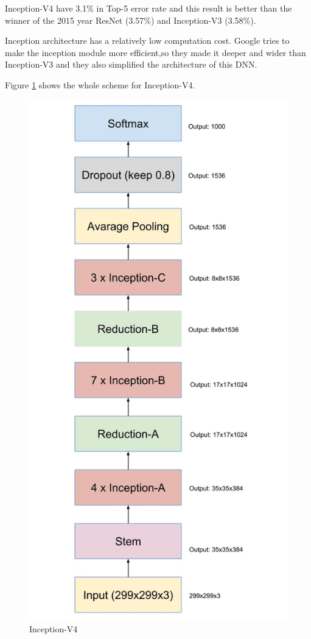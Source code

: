 \documentclass[titlepage]{report}
\begin{document}
Inception-V4 have 3.1\% in Top-5 error rate and this result is better than the winner of the 2015 year ResNet (3.57\%) and  Inception-V3 (3.58\%). 

Inception architecture has a relatively low computation cost. Google tries to make the inception module more efficient,so they made it deeper and wider than Inception-V3 and they also simplified the architecture of this DNN.

Figure \ref{fig:inception_v4} shows the whole scheme for Inception-V4.

\begin{figure}[h!]
    \centering
    \includegraphics[scale=0.3]{inception_v4}
    \caption{Inception-V4}
    \label{fig:inception_v4}
\end{figure}
\end{document}
